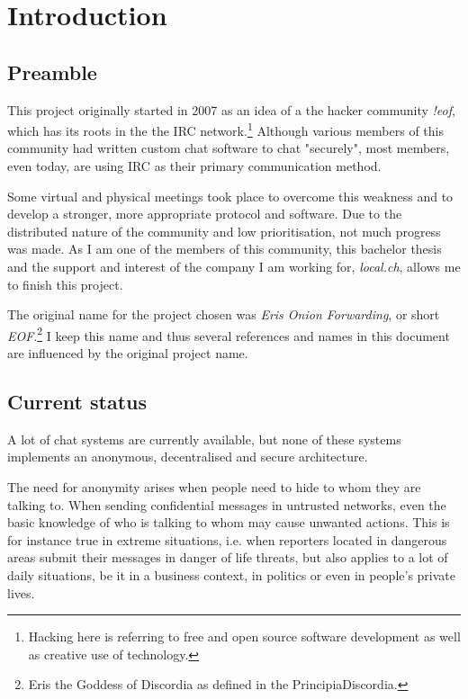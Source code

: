 \chapter{Introduction}
\section{Preamble}
This project originally started in 2007 as an idea of a the hacker
community \textit{!eof}, which has its roots in the the IRC
network.\footnote{Hacking here is referring to free and open source
software development as well as creative use of technology.}
Although various members of this community had written custom chat software
to chat "securely", most members, even today, are using IRC as their
primary communication method.

Some virtual and physical meetings took place to overcome this weakness
and to develop a stronger, more appropriate protocol and software.
Due to the distributed nature of the community and low prioritisation, not
much progress was made. As I am one of the members of this community,
this bachelor thesis and the support and interest
of the company I am working for, \textit{local.ch}, allows me to finish
this project.

The original name for the project chosen was \textit{Eris Onion Forwarding}, or
short \textit{EOF}.\footnote{Eris the Goddess of Discordia as defined
in the PrincipiaDiscordia.}
I keep this name and thus several references and names
in this document are influenced by the original project name.
\section{Current status}
A lot of chat systems are currently available, 
but none of these systems implements an anonymous, decentralised and secure architecture.

The need for anonymity arises when people need to hide to whom they are talking to. 
When sending confidential messages 
in untrusted networks, even the basic knowledge of who is talking to whom may 
cause unwanted actions.
This is for instance true in extreme situations, i.e. when reporters located in 
dangerous areas submit their messages in danger of life threats, but also 
applies to a lot of daily situations, be it in a business context,
in politics or even in people's private lives. 

